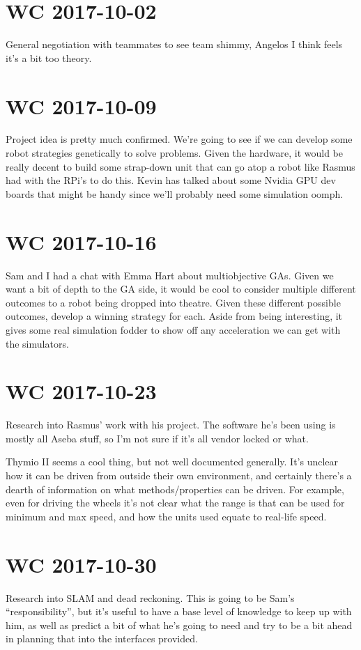 \documentclass[a4paper]{article}
\begin{document}
\section{WC 2017-10-02}
    General negotiation with teammates to see team shimmy, Angelos I think feels it's a bit too theory.
\section{WC 2017-10-09}
    Project idea is pretty much confirmed. We're going to see if we can develop some robot strategies genetically to
    solve problems. Given the hardware, it would be really decent to build some strap-down unit that can go atop a robot
    like Rasmus had with the RPi's to do this. Kevin has talked about some Nvidia GPU dev boards that might be handy
    since we'll probably need some simulation oomph.
\section{WC 2017-10-16}
    Sam and I had a chat with Emma Hart about multiobjective GAs. Given we want a bit of depth to the GA side, it would
    be cool to consider multiple different outcomes to a robot being dropped into theatre. Given these different
    possible outcomes, develop a winning strategy for each. Aside from being interesting, it gives some real simulation
    fodder to show off any acceleration we can get with the simulators.
\section{WC 2017-10-23}
    Research into Rasmus' work with his project. The software he's been using is mostly all Aseba stuff, so I'm not sure
    if it's all vendor locked or what.

    Thymio II seems a cool thing, but not well documented generally. It's unclear how it can be driven from outside
    their own environment, and certainly there's a dearth of information on what methods/properties can be driven. For
    example, even for driving the wheels it's not clear what the range is that can be used for minimum and max speed,
    and how the units used equate to real-life speed.
\section{WC 2017-10-30}
    Research into SLAM and dead reckoning. This is going to be Sam's ``responsibility'', but it's useful to have a base
    level of knowledge to keep up with him, as well as predict a bit of what he's going to need and try to be a bit
    ahead in planning that into the interfaces provided.
\end{document}
